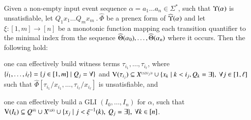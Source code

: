 \begin{lemma}\label{lemma:subst-quant}
  Given a non-empty input event sequence $\alpha = a_1 \ldots a_n \in
  \Sigma^*$, such that $\Upsilon({\alpha})$ is unsatisfiable, let
  $Q_1x_1 \ldots Q_mx_m ~.~ \widehat{\Phi}$ be a prenex form of
  $\widehat{\Upsilon}({\alpha})$ and let $\xi : [1,m] \rightarrow [n]$ be a
  monotonic function mapping each transition quantifier to the minimal
  index from the sequence $\widehat{\Theta}({\alpha_0}), \ldots,
  \widehat{\Theta}({\alpha_n})$ where it occurs. Then the following
  hold: \begin{compactenum}
  \item\label{it1:subst-quant} one can effectively build witness terms
    $\tau_{i_1}, \ldots, \tau_{i_\ell}$, where \(\{ i_1,
    \ldots,i_\ell \} = \{ j \in [1,m] \mid Q_j = \forall \}\) and
    \(\mathrm{V}({\tau_{i_j}}) \subseteq {X}^{\scriptscriptstyle{({\leq \xi(i_j)})}} \cup
    \{ x_k \mid k < i_j, Q_k = \exists \},~ \forall j \in [1,\ell]\)
    such that $\widehat{\Phi}[\tau_{i_1}/x_{i_1}, \ldots,
      \tau_{i_\ell}/x_{i_\ell}]$ is unsatisfiable, and
  \item\label{it2:subst-quant} one can effectively build a GLI $(I_0,
    \ldots, I_n)$ for $\alpha$, such that \(\mathrm{V}({I_k}) \subseteq
    {Q}^{\scriptscriptstyle{({k})}} \cup {X}^{\scriptscriptstyle{({\leq k})}} \cup \{ x_j \mid j <
      \xi^{-1}(k),~ Q_j = \exists \},~ \forall k \in [n]\).
  \end{compactenum}
\end{lemma}
